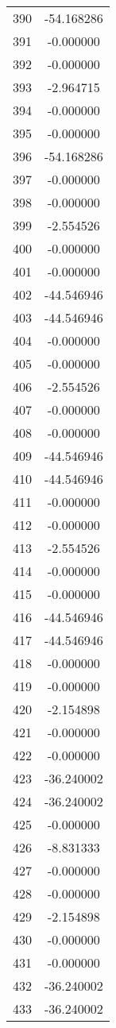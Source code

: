\documentclass[12pt]{article}
\begin{document}
\begin{longtable}{@{}cc@{}}
390 & -54.168286 \\
391 & -0.000000 \\
392 & -0.000000 \\
393 & -2.964715 \\
394 & -0.000000 \\
395 & -0.000000 \\
396 & -54.168286 \\
397 & -0.000000 \\
398 & -0.000000 \\
399 & -2.554526 \\
400 & -0.000000 \\
401 & -0.000000 \\
402 & -44.546946 \\
403 & -44.546946 \\
404 & -0.000000 \\
405 & -0.000000 \\
406 & -2.554526 \\
407 & -0.000000 \\
408 & -0.000000 \\
409 & -44.546946 \\
410 & -44.546946 \\
411 & -0.000000 \\
412 & -0.000000 \\
413 & -2.554526 \\
414 & -0.000000 \\
415 & -0.000000 \\
416 & -44.546946 \\
417 & -44.546946 \\
418 & -0.000000 \\
419 & -0.000000 \\
420 & -2.154898 \\
421 & -0.000000 \\
422 & -0.000000 \\
423 & -36.240002 \\
424 & -36.240002 \\
425 & -0.000000 \\
426 & -8.831333 \\
427 & -0.000000 \\
428 & -0.000000 \\
429 & -2.154898 \\
430 & -0.000000 \\
431 & -0.000000 \\
432 & -36.240002 \\
433 & -36.240002 \\

\end{longtable}
\end{document}
